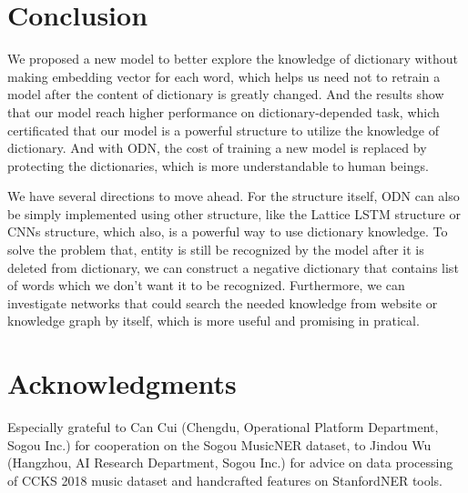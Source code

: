 \documentclass[letterpaper]{article} %
\begin{document}
\section{Conclusion}

We proposed a new model to better explore the knowledge of dictionary without making embedding vector for each word, which helps us need not to retrain a model after the content of dictionary is greatly changed. And the results show that our model reach higher performance on dictionary-depended task, which certificated that our model is a powerful structure to utilize the knowledge of dictionary. And with ODN, the cost of training a new model is replaced by protecting the dictionaries, which is more understandable to human beings.

We have several directions to move ahead. For the structure itself, ODN can also be simply implemented using other structure, like the Lattice LSTM structure or CNNs structure, which also, is a powerful way to use dictionary knowledge. To solve the problem that, entity is still be recognized by the model after it is deleted from dictionary, we can construct a negative dictionary that contains list of words which we don't want it to be recognized. Furthermore, we can investigate networks that could search the needed knowledge from website or knowledge graph by itself, which is more useful and promising in pratical.

\section{ Acknowledgments }

Especially grateful to Can Cui (Chengdu, Operational Platform Department, Sogou Inc.) for cooperation on the Sogou MusicNER dataset, to Jindou Wu (Hangzhou, AI Research Department, Sogou Inc.) for advice on data processing of CCKS 2018 music dataset and handcrafted features on StanfordNER tools.

\small


\end{document}

